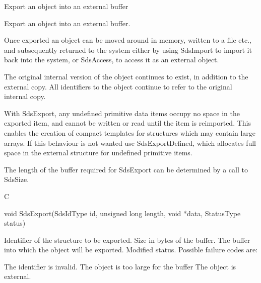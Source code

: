 \begin{manroutinedescription}
      Export an object into an external buffer

      Export an object into an external buffer.

      Once exported an object can be moved around in memory, written to
      a file etc., and subsequently returned to the {} system %
either by using
      SdsImport to import it back into the system, or SdsAccess, to access it
      as an external object.

      The original internal version of the
      object continues to exist, in addition to the external copy. All
      identifiers to the object continue to refer to the original internal
      copy.
 
      With SdsExport, any undefined primitive data items occupy no
      space in the exported item, and cannot be written or read
      until the item is reimported. This enables the creation of
      compact templates for structures which may contain large arrays.
      If this behaviour is not wanted use SdsExportDefined, which allocates
      full space in the external structure for undefined primitive
      items.

      The length of the buffer required for SdsExport can be determined
      by a call to SdsSize.
 
      C

      void SdsExport(SdsIdType id, unsigned long length,
                    void *data, StatusType {\mantt{*}} {} %
status)
 
\begin{manparametertable}
  Identifier of the structure to %
be exported.
 Size in bytes of the %
buffer.
 The buffer into which the object %
will be
                          exported.
 Modified status. Possible %
failure codes are:
\end{manparametertable}
\begin{mantwocolumntable}
The identifier is invalid.
The object is too large for %
the buffer
The object is external.
\end{mantwocolumntable}
\end{manroutinedescription}
